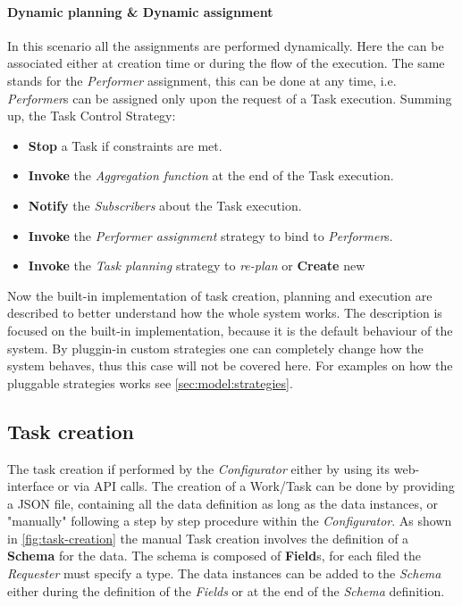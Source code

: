 \paragraph{Dynamic \utask{} planning \& Dynamic assignment}
\label{subs:dynamic-dynamic}
In this scenario all the assignments are performed dynamically. Here the \utask{}
can be associated either at creation time or during the flow of the execution.
The same stands for the \emph{Performer} assignment, this can be done at any time,
i.e. \emph{Performer}s can be assigned only upon the request of a Task execution. 
Summing up, the Task Control Strategy:
\begin{itemize}
	\item \textbf{Stop} a Task if constraints are met.
	\item \textbf{Invoke} the \emph{Aggregation function} at the end of the Task
	execution.
	\item \textbf{Notify} the \emph{Subscribers} about the Task execution.
	\item \textbf{Invoke} the \emph{Performer assignment} strategy to bind \utask{}
	to \emph{Performer}s.
	\item \textbf{Invoke} the \emph{Task planning} strategy to \emph{re-plan}
	\utask{} or \textbf{Create} new \utask{}
\end{itemize}


Now the built-in implementation of task creation, planning and execution are
described to better understand how the whole system works. The description is
focused on the built-in implementation, because it is the default behaviour of
the system. By pluggin-in custom strategies one can completely change how the
system behaves, thus this case will not be covered here. For examples on how the
pluggable strategies works see \ref{sec:model:strategies}.

\subsection{Task creation}
The task creation if performed by the \emph{Configurator} either by using its
web-interface or via API calls. The creation of a Work/Task can be done by
providing a JSON file, containing all the data definition as long as the data
instances, or "manually" following a step by step procedure within the
\emph{Configurator}. As shown in \autoref{fig:task-creation} the manual Task
creation involves the definition of a \textbf{Schema} for the data. The schema
is composed of \textbf{Field}s, for each filed the \emph{Requester} must specify
a type. The data instances can be added to the \emph{Schema} either during the
definition of the \emph{Fields} or at the end of the \emph{Schema} definition.

